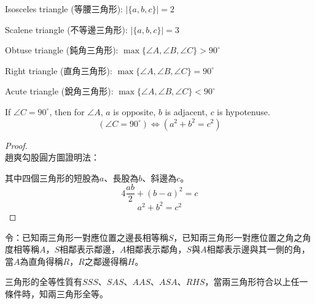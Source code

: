\documentclass[a4paper,12pt]{report}
\begin{document}
\item Isosceles triangle (等腰三角形): $|\{a,b,c\}|=2$
\item Scalene triangle (不等邊三角形): $|\{a,b,c\}|=3$
\item Obtuse triangle (鈍角三角形): $\max\{\angle A,\angle B,\angle C\}>90^\circ$
\item Right triangle (直角三角形): $\max\{\angle A,\angle B,\angle C\}=90^\circ$
\item Acute triangle (銳角三角形): $\max\{\angle A,\angle B,\angle C\}<90^\circ$
\item 
\eit
{}
If $\angle C=90^\circ$, then for $\angle A$, $a$ is opposite, $b$ is adjacent, $c$ is hypotenuse.
\[(\angle C=90^\circ)\iff (a^2+b^2=c^2)\]
\begin{proof}\mbox{}\\
趙爽勾股圓方圖證明法：
\begin{center}
\end{center}
其中四個三角形的短股為$a$、長股為$b$、斜邊為$c$。
\[4\frac{ab}{2}+(b-a)^2=c\]
\[a^2+b^2=c^2\]
\end{proof}
令：已知兩三角形一對應位置之邊長相等稱$S$，已知兩三角形一對應位置之角之角度相等稱$A$，$S$相鄰表示鄰邊，$A$相鄰表示鄰角，$S$與$A$相鄰表示邊與其一側的角，當$A$為直角得稱$R$，$R$之鄰邊得稱$H$。

三角形的全等性質有$SSS$、$SAS$、$AAS$、$ASA$、$RHS$，當兩三角形符合以上任一條件時，知兩三角形全等。
\end{document}
